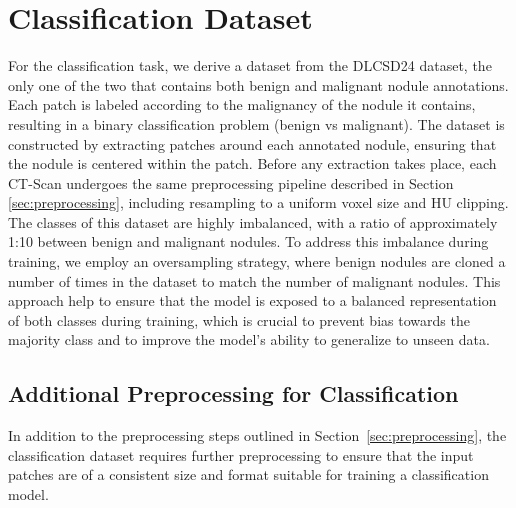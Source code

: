 \section{Classification Dataset}
For the classification task, we derive a dataset from the DLCSD24 dataset, the only one of the two that contains both benign and malignant nodule annotations.
Each patch is labeled according to the malignancy of the nodule it contains, resulting in a binary classification problem (benign vs malignant).
The dataset is constructed by extracting patches around each annotated nodule, ensuring that the nodule is centered within the patch. Before any extraction takes place, each CT-Scan undergoes the same preprocessing pipeline described in Section \ref{sec:preprocessing}, including resampling to a uniform voxel size and HU clipping.
The classes of this dataset are highly imbalanced, with a ratio of approximately 1:10 between benign and malignant nodules. To address this imbalance during training, we employ an oversampling strategy, where benign nodules are cloned a number of times in the dataset to match the number of malignant nodules. This approach help to ensure that the model is exposed to a balanced representation of both classes during training, which is crucial to prevent bias towards the majority class and to improve the model's ability to generalize to unseen data.

\subsection{Additional Preprocessing for Classification}
In addition to the preprocessing steps outlined in Section~\ref{sec:preprocessing}, the classification dataset requires further preprocessing to ensure that the input patches are of a consistent size and format suitable for training a classification model.

